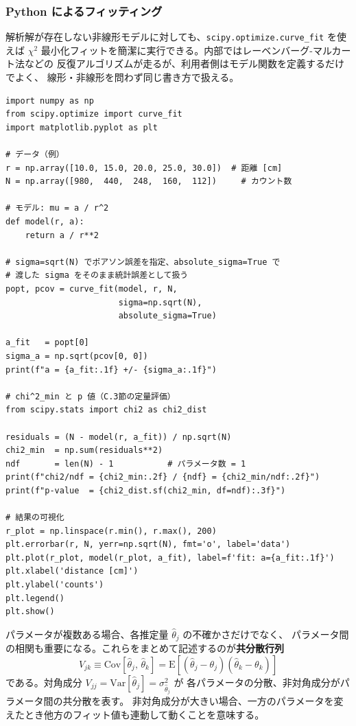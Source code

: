 \documentclass[uplatex,dvipdfmx,12pt,nomag]{jsarticle}
\begin{document}
\subsubsection*{Python によるフィッティング}

解析解が存在しない非線形モデルに対しても、\texttt{scipy.optimize.curve\_fit} を使えば
$\chi^2$ 最小化フィットを簡潔に実行できる。内部ではレーベンバーグ-マルカート法などの
反復アルゴリズムが走るが、利用者側はモデル関数を定義するだけでよく、
線形・非線形を問わず同じ書き方で扱える。

\begin{verbatim}
import numpy as np
from scipy.optimize import curve_fit
import matplotlib.pyplot as plt

# データ（例）
r = np.array([10.0, 15.0, 20.0, 25.0, 30.0])  # 距離 [cm]
N = np.array([980,  440,  248,  160,  112])     # カウント数

# モデル: mu = a / r^2
def model(r, a):
    return a / r**2

# sigma=sqrt(N) でポアソン誤差を指定、absolute_sigma=True で
# 渡した sigma をそのまま統計誤差として扱う
popt, pcov = curve_fit(model, r, N,
                       sigma=np.sqrt(N),
                       absolute_sigma=True)

a_fit   = popt[0]
sigma_a = np.sqrt(pcov[0, 0])
print(f"a = {a_fit:.1f} +/- {sigma_a:.1f}")

# chi^2_min と p 値（C.3節の定量評価）
from scipy.stats import chi2 as chi2_dist

residuals = (N - model(r, a_fit)) / np.sqrt(N)
chi2_min  = np.sum(residuals**2)
ndf       = len(N) - 1           # パラメータ数 = 1
print(f"chi2/ndf = {chi2_min:.2f} / {ndf} = {chi2_min/ndf:.2f}")
print(f"p-value  = {chi2_dist.sf(chi2_min, df=ndf):.3f}")

# 結果の可視化
r_plot = np.linspace(r.min(), r.max(), 200)
plt.errorbar(r, N, yerr=np.sqrt(N), fmt='o', label='data')
plt.plot(r_plot, model(r_plot, a_fit), label=f'fit: a={a_fit:.1f}')
plt.xlabel('distance [cm]')
plt.ylabel('counts')
plt.legend()
plt.show()
\end{verbatim}

パラメータが複数ある場合、各推定量 $\hat{\theta}_j$ の不確かさだけでなく、
パラメータ間の相関も重要になる。これらをまとめて記述するのが\textbf{共分散行列}
\begin{equation}
  V_{jk} \equiv \mathrm{Cov}[\hat{\theta}_j,\,\hat{\theta}_k]
           = \mathrm{E}\!\left[(\hat{\theta}_j - \theta_j)(\hat{\theta}_k - \theta_k)\right]
\end{equation}
である。対角成分 $V_{jj} = \mathrm{Var}[\hat{\theta}_j] = \sigma_{\hat{\theta}_j}^2$ が
各パラメータの分散、非対角成分がパラメータ間の共分散を表す。
非対角成分が大きい場合、一方のパラメータを変えたとき他方のフィット値も連動して動くことを意味する。
\end{document}

